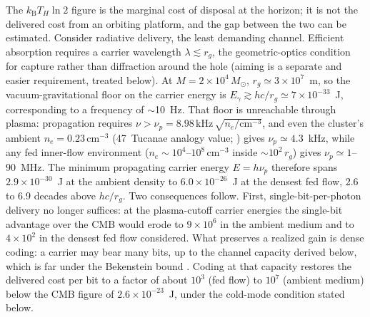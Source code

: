\documentclass[11pt]{article}
\newcommand{\msun}{\ensuremath{M_\odot}}
\newcommand{\kb}{\ensuremath{k_{\mathrm{B}}}}
\begin{document}
The $\kb T_H \ln 2$ figure is the marginal cost of disposal at the horizon; it is not the delivered cost from an orbiting platform, and the gap between the two can be estimated. Consider radiative delivery, the least demanding channel. Efficient absorption requires a carrier wavelength $\lambda \lesssim r_g$, the geometric-optics condition for capture rather than diffraction around the hole (aiming is a separate and easier requirement, treated below). At $M = 2\times10^{4}\,\msun$, $r_g \simeq 3\times10^{7}$~m, so the vacuum-gravitational floor on the carrier energy is $E_\gamma \gtrsim hc/r_g \simeq 7\times10^{-33}$~J, corresponding to a frequency of $\sim$10~Hz. That floor is unreachable through plasma: propagation requires $\nu > \nu_p = 8.98\,\mathrm{kHz}\,\sqrt{n_e/\mathrm{cm}^{-3}}$, and even the cluster's ambient $n_e = 0.23\,\mathrm{cm}^{-3}$ (47~Tucanae analogy value; \citealt{Abbate2018}) gives $\nu_p \simeq 4.3$~kHz, while any fed inner-flow environment ($n_e \sim 10^{4}$--$10^{8}\,\mathrm{cm}^{-3}$ inside $\sim$$10^{2}\,r_g$) gives $\nu_p \simeq 1$--$90$~MHz. The minimum propagating carrier energy $E = h\nu_p$ therefore spans $2.9\times10^{-30}$~J at the ambient density to $6.0\times10^{-26}$~J at the densest fed flow, 2.6 to 6.9 decades above $hc/r_g$. Two consequences follow. First, single-bit-per-photon delivery no longer suffices: at the plasma-cutoff carrier energies the single-bit advantage over the CMB would erode to $9\times10^{6}$ in the ambient medium and to $4\times10^{2}$ in the densest fed flow considered. What preserves a realized gain is dense coding: a carrier may bear many bits, up to the channel capacity derived below, which is far under the Bekenstein bound \citep{Bekenstein1981,Bousso2002}. Coding at that capacity restores the delivered cost per bit to a factor of about $10^{3}$ (fed flow) to $10^{7}$ (ambient medium) below the CMB figure of $2.6\times10^{-23}$~J, under the cold-mode condition stated below.
\end{document}
